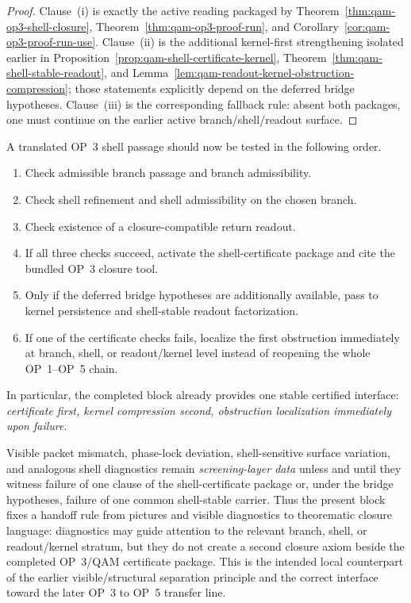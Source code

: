 \begin{proof}
Clause~(i) is exactly the active reading packaged by Theorem~\ref{thm:qam-op3-shell-closure}, Theorem~\ref{thm:qam-op3-proof-run}, and Corollary~\ref{cor:qam-op3-proof-run-use}. Clause~(ii) is the additional kernel-first strengthening isolated earlier in Proposition~\ref{prop:qam-shell-certificate-kernel}, Theorem~\ref{thm:qam-shell-stable-readout}, and Lemma~\ref{lem:qam-readout-kernel-obstruction-compression}; those statements explicitly depend on the deferred bridge hypotheses. Clause~(iii) is the corresponding fallback rule: absent both packages, one must continue on the earlier active branch/shell/readout surface.
\end{proof}

\begin{corollary}\label{cor:qam-op3-operational-checklist}
A translated OP~3 shell passage should now be tested in the following order.
\begin{enumerate}[leftmargin=2em]
  \item Check admissible branch passage and branch admissibility.
  \item Check shell refinement and shell admissibility on the chosen branch.
  \item Check existence of a closure-compatible return readout.
  \item If all three checks succeed, activate the shell-certificate package and cite the bundled OP~3 closure tool.
  \item Only if the deferred bridge hypotheses are additionally available, pass to kernel persistence and shell-stable readout factorization.
  \item If one of the certificate checks fails, localize the first obstruction immediately at branch, shell, or readout/kernel level instead of reopening the whole OP~1--OP~5 chain.
\end{enumerate}
In particular, the completed block already provides one stable certified interface: \emph{certificate first, kernel compression second, obstruction localization immediately upon failure}.
\end{corollary}

\begin{remark}\label{rem:qam-op3-diagnostic-handoff}
Visible packet mismatch, phase-lock deviation, shell-sensitive surface variation, and analogous shell diagnostics remain \emph{screening-layer data} unless and until they witness failure of one clause of the shell-certificate package or, under the bridge hypotheses, failure of one common shell-stable carrier. Thus the present block fixes a handoff rule from pictures and visible diagnostics to theorematic closure language: diagnostics may guide attention to the relevant branch, shell, or readout/kernel stratum, but they do not create a second closure axiom beside the completed OP~3/QAM certificate package. This is the intended local counterpart of the earlier visible/structural separation principle and the correct interface toward the later OP~3 to OP~5 transfer line.
\end{remark}

